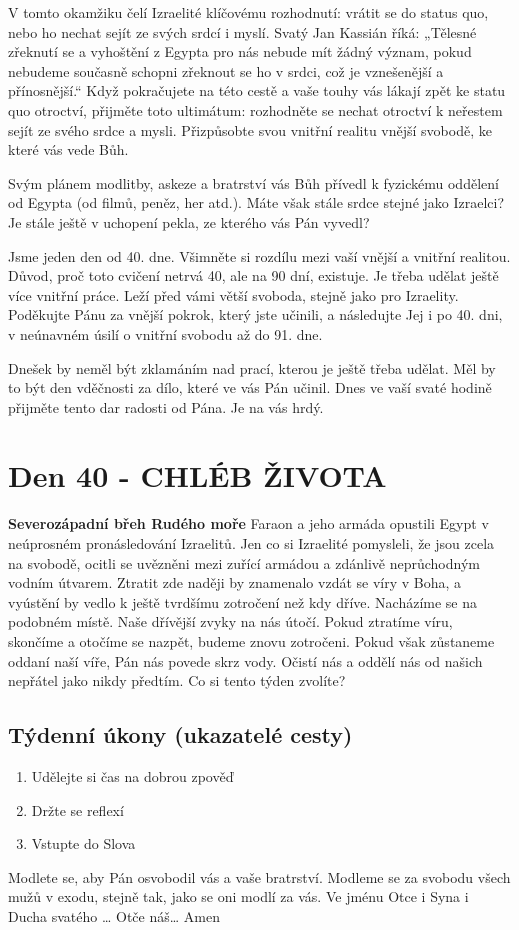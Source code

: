\documentclass[11pt]{article}
\newcommand{\zacatekSestyTyden}{
  \textbf{Severozápadní břeh Rudého moře} \newline 
  Faraon a jeho armáda opustili Egypt v neúprosném pronásledování Izraelitů. Jen co si Izraelité pomysleli, že jsou zcela na svobodě, ocitli se uvězněni mezi zuřící armádou a zdánlivě neprůchodným vodním útvarem. Ztratit zde naději by znamenalo vzdát se víry v Boha, a vyústění by vedlo k ještě tvrdšímu zotročení než kdy dříve. Nacházíme se na podobném místě. Naše dřívější zvyky na nás útočí. Pokud ztratíme víru, skončíme a otočíme se nazpět, budeme znovu zotročeni. Pokud však zůstaneme oddaní naší víře, Pán nás povede skrz vody. Očistí nás a oddělí nás od našich nepřátel jako nikdy předtím. Co si tento týden zvolíte?

\subsection*{Týdenní úkony (ukazatelé cesty)}
\begin{enumerate}
  \item Udělejte si čas na dobrou zpověď
  \item Držte se reflexí
  \item Vstupte do Slova
\end{enumerate}
Modlete se, aby Pán osvobodil vás a vaše bratrství. \newline
Modleme se za svobodu všech mužů v exodu, stejně tak, jako se oni modlí za vás.\newline
Ve jménu Otce i Syna i Ducha svatého …  Otče náš… Amen
}
\begin{document}
V tomto okamžiku čelí Izraelité klíčovému rozhodnutí: vrátit se do status quo, nebo ho nechat sejít ze svých srdcí i
myslí. Svatý Jan Kassián říká: „Tělesné zřeknutí se a vyhoštění z Egypta pro nás nebude mít žádný význam, pokud
nebudeme současně schopni zřeknout se ho v srdci, což je vznešenější a přínosnější.“ Když pokračujete na této cestě a
vaše touhy vás lákají zpět ke statu quo otroctví, přijměte toto ultimátum: rozhodněte se nechat otroctví k neřestem sejít
ze svého srdce a mysli. Přizpůsobte svou vnitřní realitu vnější svobodě, ke které vás vede Bůh.

Svým plánem modlitby, askeze a bratrství vás Bůh přívedl k fyzickému oddělení od Egypta (od filmů, peněz, her atd.).
Máte však stále srdce stejné jako Izraelci? Je stále ještě v uchopení pekla, ze kterého vás Pán vyvedl?

Jsme jeden den od 40. dne. Všimněte si rozdílu mezi vaší vnější a vnitřní realitou. Důvod, proč toto cvičení netrvá 40,
ale na 90 dní, existuje. Je třeba udělat ještě více vnitřní práce. Leží před vámi větší svoboda, stejně jako pro Izraelity.
Poděkujte Pánu za vnější pokrok, který jste učinili, a následujte Jej i po 40. dni, v neúnavném úsilí o vnitřní svobodu až
do 91. dne.

Dnešek by neměl být zklamáním nad prací, kterou je ještě třeba udělat. Měl by to být den vděčnosti za dílo, které ve
vás Pán učinil. Dnes ve vaší svaté hodině přijměte tento dar radosti od Pána. Je na vás hrdý.



\newpage
\section{Den 40 - CHLÉB ŽIVOTA}
\zacatekSestyTyden
\end{document}
